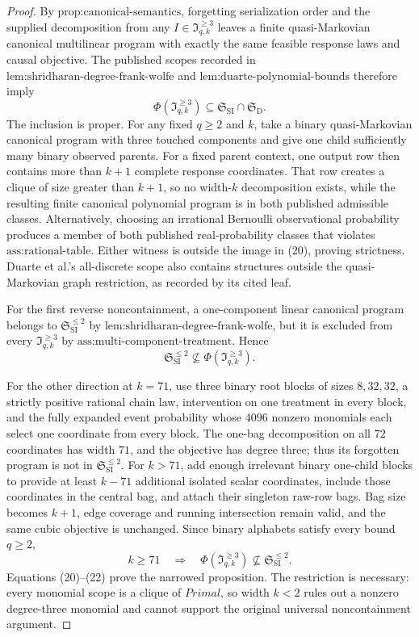 \documentclass{article}
\begin{document}
\begin{proof}
By \(\text{prop:canonical-semantics}\), forgetting serialization order and the supplied decomposition from any \(I\in\mathfrak I_{q,k}^{\ge3}\) leaves a finite quasi-Markovian canonical multilinear program with exactly the same feasible response laws and causal objective.  The published scopes recorded in \(\text{lem:shridharan-degree-frank-wolfe}\) and \(\text{lem:duarte-polynomial-bounds}\) therefore imply
\[
\Phi(\mathfrak I_{q,k}^{\ge3})
\subseteq\mathfrak S_{\mathrm{SI}}\cap\mathfrak S_{\mathrm D}. \tag{20}
\]
The inclusion is proper.  For any fixed \(q\ge2\) and \(k\), take a binary quasi-Markovian canonical program with three touched components and give one child sufficiently many binary observed parents.  For a fixed parent context, one output row then contains more than \(k+1\) complete response coordinates.  That row creates a clique of size greater than \(k+1\), so no width-\(k\) decomposition exists, while the resulting finite canonical polynomial program is in both published admissible classes.  Alternatively, choosing an irrational Bernoulli observational probability produces a member of both published real-probability classes that violates \(\text{ass:rational-table}\).  Either witness is outside the image in (20), proving strictness.  Duarte et al.'s all-discrete scope also contains structures outside the quasi-Markovian graph restriction, as recorded by its cited leaf.

For the first reverse noncontainment, a one-component linear canonical program belongs to \(\mathfrak S_{\mathrm{SI}}^{\le2}\) by \(\text{lem:shridharan-degree-frank-wolfe}\), but it is excluded from every \(\mathfrak I_{q,k}^{\ge3}\) by \(\text{ass:multi-component-treatment}\).  Hence
\[
\mathfrak S_{\mathrm{SI}}^{\le2}
\not\subseteq\Phi(\mathfrak I_{q,k}^{\ge3}). \tag{21}
\]

For the other direction at \(k=71\), use three binary root blocks of sizes \(8,32,32\), a strictly positive rational chain law, intervention on one treatment in every block, and the fully expanded event probability whose \(4096\) nonzero monomials each select one coordinate from every block.  The one-bag decomposition on all \(72\) coordinates has width \(71\), and the objective has degree three; thus its forgotten program is not in \(\mathfrak S_{\mathrm{SI}}^{\le2}\).  For \(k>71\), add enough irrelevant binary one-child blocks to provide at least \(k-71\) additional isolated scalar coordinates, include those coordinates in the central bag, and attach their singleton raw-row bags.  Bag size becomes \(k+1\), edge coverage and running intersection remain valid, and the same cubic objective is unchanged.  Since binary alphabets satisfy every bound \(q\ge2\),
\[
k\ge71\quad\Longrightarrow\quad
\Phi(\mathfrak I_{q,k}^{\ge3})
\not\subseteq\mathfrak S_{\mathrm{SI}}^{\le2}. \tag{22}
\]
Equations (20)--(22) prove the narrowed proposition.  The restriction is necessary: every monomial scope is a clique of \(Primal\), so width \(k<2\) rules out a nonzero degree-three monomial and cannot support the original universal noncontainment argument.
\end{proof}
\end{document}
